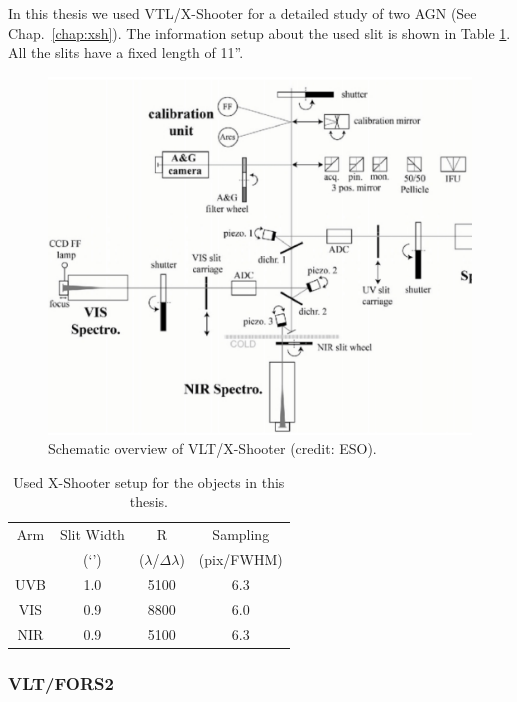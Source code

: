 In this thesis we used VTL/X-Shooter for a detailed study of two AGN (See Chap.~\ref{chap:xsh}). The information setup about the used slit is shown in Table \ref{tab2:xsh}. All the slits have a fixed length of 11''.


 \begin{figure}
 \centering
 \includegraphics[width=\textwidth]{Chapter2_data/xsh.ps}
    \caption{Schematic overview of VLT/X-Shooter (credit: ESO).}
 \label{sec2:xshsch}
 \end{figure}
 

\begin{table}
\begin{center}
\caption{Used X-Shooter setup for the objects in this thesis.}
\begin{tabular}{|c|c|c|c|}
\hline
Arm & Slit Width & R  & Sampling  \\
      &   (‘')   &     ($\lambda$/$\Delta\lambda$) & (pix/FWHM) \\ \hline
UVB & 1.0 & 5100 & 6.3 \\ \hline
VIS  &  0.9 & 8800 & 6.0 \\ \hline
NIR   &  0.9 & 5100 & 6.3 \\ 
\hline
\end{tabular}
\label{tab2:xsh}
\end{center}	
\end{table}



\subsubsection{VLT/FORS2}
\label{sec2:fors}

